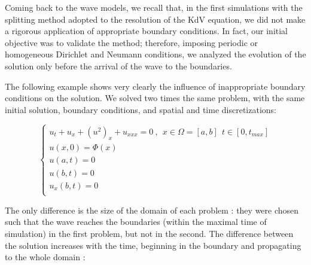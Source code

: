 \indent Coming back to the wave models, we recall that, in the first simulations with the splitting method adopted to the resolution of the KdV equation, we did not make a rigorous application of appropriate boundary conditions. In fact, our initial objective was to validate the method; therefore, imposing periodic or homogeneous Dirichlet and Neumann conditions, we analyzed the evolution of the solution only before the arrival of the wave to the boundaries.

\indent The following example shows very clearly the influence of inappropriate boundary conditions on the solution. We solved two times the same problem, with the same initial solution, boundary conditions, and spatial and time discretizations: 

\begin{equation}
    \begin{cases}
    u_t + u_x + (u^2)_x + u_{xxx} = 0 \ , \ \ x \in \Omega=[a,b] \ \ t \in [0, t_{max}] \\
    u(x,0) = \Phi(x) \\
    u(a,t) = 0 \\
    u(b,t) = 0 \\
    u_x(b,t) = 0  \\ 
    \end{cases}
\end{equation}

\indent The only difference is the size of the domain of each problem : they were chosen such that the wave reaches the boundaries (within the maximal time of simulation) in the first problem, but not in the second. The difference between the solution increases with the time, beginning in the boundary and propagating to the whole domain :

